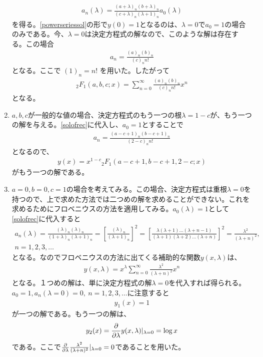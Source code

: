 \documentclass[report,paper=a4, fontsize=12pt, line_length=16cm, number_of_lines=33,dvipdfmx]{jlreq}
\numberwithin{equation}{section}
\newcommand{\HG}{{}_2F_1}
\begin{document}
\begin{enumerate}
\begin{align}
  a_n(\lambda)=\frac{(a+\lambda)_n(b+\lambda)_n}{(c+\lambda)_n(\lambda+1)_n}a_0(\lambda)\tag{♤}\label{solofrec}
\end{align}
を得る。\eqref{powerseriessol}の形で$y(0)=1$となるのは、$\lambda=0$で$a_0=1$の場合のみである。今、$\lambda=0$は決定方程式の解なので、このような解は存在する。この場合
\begin{align*}
  a_n=\frac{(a)_n(b)_n}{(c)_n n!}
\end{align*}
となる。ここで $(1)_n=n!$ を用いた。したがって
\begin{align*}
  \HG(a,b,c;x)=\sum_{n=0}^{\infty}\frac{(a)_n(b)_n}{(c)_n n!}x^{n}
\end{align*}
となる。
\item $a,b,c$が一般的な値の場合、決定方程式のもう一つの根$\lambda=1-c$が、もう一つの解を与える。\eqref{solofrec}に代入し、$a_0=1$とすることで
\begin{align*}
  a_n=\frac{(a-c+1)_n(b-c+1)_n}{(2-c)_n n!}
\end{align*}
となるので、
\begin{align*}
  y(x)=x^{1-c}\HG(a-c+1,b-c+1,2-c;x)
\end{align*}
がもう一つの解である。
\item $a=0,b=0,c=1$の場合を考えてみる。この場合、決定方程式は重根$\lambda=0$を持つので、上で求めた方法では二つめの解を求めることができない。これを求めるためにフロベニウスの方法を適用してみる。$a_0(\lambda)=1$として\eqref{solofrec}に代入すると
\begin{align*}
  a_n(\lambda)
  =\frac{(\lambda)_n(\lambda)_n}{(1+\lambda)_n(\lambda+1)_n}
  =\left[\frac{(\lambda)_n}{(\lambda+1)_n}\right]^2
  =\left[\frac{\lambda(\lambda+1)\dots (\lambda+n-1)}{(\lambda+1)(\lambda+2)\dots (\lambda+n)}\right]^2
  =\frac{\lambda^2}{(\lambda+n)^2}
  ,\\
  n=1,2,3,\dots
\end{align*}
となる。なのでフロベニウスの方法に出てくる補助的な関数$y(x,\lambda)$は、
\begin{align*}
  y(x,\lambda)=x^{\lambda}\sum_{n=0}^{\infty}\frac{\lambda^2}{(\lambda+n)^2} x^n
\end{align*}
となる。１つめの解は、単に決定方程式の解$\lambda=0$を代入すれば得られる。$a_0=1,a_n(\lambda=0)=0,\ n=1,2,3,\dots$に注意すると
\begin{align*}
  y_1(x)=1
\end{align*}
が一つの解である。もう一つの解は、
\begin{align*}
  y_2(x)=\pdv{\lambda} y(x,\lambda)|_{\lambda=0}
  =\log x
\end{align*}
である。ここで$\pdv{\lambda} \frac{\lambda^2}{(\lambda+n)^2}|_{\lambda=0}=0$であることを用いた。


\end{enumerate}
\end{document}
